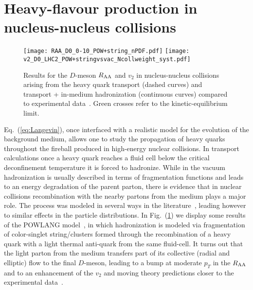 \documentclass{PoS}
\begin{document}
\section{Heavy-flavour production in nucleus-nucleus collisions}
\begin{figure}[!ht]
\begin{center}
\texttt{[image: RAA\_D0\_0-10\_POW+string\_nPDF.pdf]}
\texttt{[image: v2\_D0\_LHC2\_POW+stringvsvac\_Ncollweight\_syst.pdf]}
\caption{Results for the $D$-meson $R_{\rm AA}$ and $v_2$ in nucleus-nucleus collisions~\cite{Beraudo:2014boa} arising from the heavy quark transport (dashed curves) and transport + in-medium hadronization (continuous curves) compared to experimental data~\cite{Adamczyk:2014uip,Abelev:2013lca}. Green crosses refer to the kinetic-equilibrium limit.}\label{fig:POWLANG} 
\end{center}
\end{figure}
Eq.~(\ref{eq:Langevin}), once interfaced with a realistic model for the evolution of the background medium, allows one to study the propagation of heavy quarks throughout the fireball produced in high-energy nuclear collisions. 
In transport calculations once a heavy quark reaches a fluid cell below the critical deconfinement temperature it is forced to hadronize. While in the vacuum hadronization is usually described in terms of fragmentation functions and leads to an energy degradation of the parent parton, there is evidence that in nuclear collisions recombination with the nearby partons from the medium plays a major role. The process was modeled in several ways in the literature~\cite{Greco:2003vf,Gossiaux:2009mk,Beraudo:2014boa}, leading however to similar effects in the particle distributions. In Fig.~(\ref{fig:POWLANG}) we display some results of the POWLANG model~\cite{Beraudo:2014boa}, in which hadronization is modeled via fragmentation of color-singlet string/clusters formed through the recombination of a heavy quark with a light thermal anti-quark from the same fluid-cell. It turns out that the light parton from the medium transfers part of its collective (radial and elliptic) flow to the final $D$-meson, leading to a bump at moderate $p_T$ in the $R_{\rm AA}$ and to an enhancement of the $v_2$ and moving theory predictions closer to the experimental data~\cite{Adamczyk:2014uip,Abelev:2013lca}.
\end{document}
